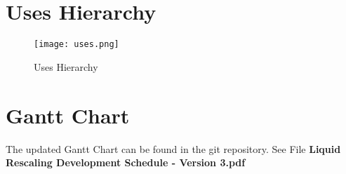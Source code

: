 \documentclass{article}
\begin{document}
\section{Uses Hierarchy}
\begin{figure}[h!]
    \centering
    \texttt{[image: uses.png]}
    \caption{Uses Hierarchy}
    \label{fig:univerise}
\end{figure}

\section{Gantt Chart}
The updated Gantt Chart can be found in the git repository. See File \textbf{Liquid Rescaling Development Schedule - Version 3.pdf}
\end{document}
